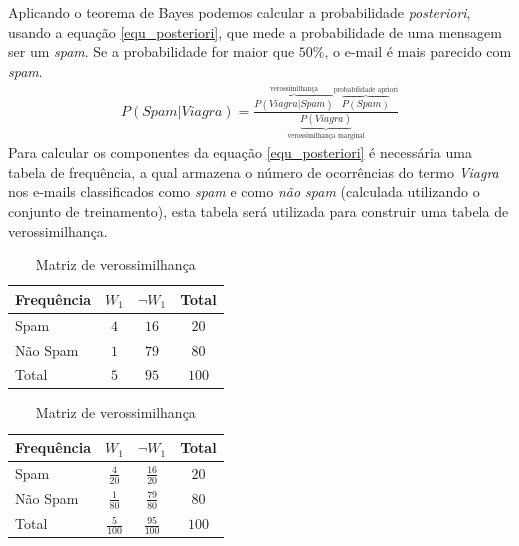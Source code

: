 Aplicando o teorema de Bayes podemos calcular a probabilidade \emph{posteriori}, usando a equação \eqref{equ_posteriori}, que mede a probabilidade de uma mensagem ser um \emph{spam}. Se a probabilidade for maior que \(50\%\), o e-mail é mais parecido com \emph{spam}.
\begin{align}
P(Spam|Viagra) =  \frac{\overbrace{P(Viagra|Spam)}^{\text{verossimilhança}} \overbrace{P(Spam)}^{\text{probabilidade apriori}}}{\underbrace{P(Viagra)}_{\text{verossimilhança marginal}}} \label{equ_posteriori}
\end{align}
Para calcular os componentes da equação \eqref{equ_posteriori} é necessária uma tabela de frequência, a qual armazena o número de ocorrências do termo \emph{Viagra} nos e-mails classificados como \emph{spam} e como \emph{não spam} (calculada utilizando o conjunto de treinamento), esta tabela será utilizada para construir uma tabela de verossimilhança.
\bgroup
\def\arraystretch{1.5}
\begin{table}[!htb]
	\caption{Matriz de frequência e de verossimilhança}
   \begin{subtable}{.5\linewidth}
    		\centering
    		
    			\begin{tabular}{lccc} \hline
    	
    			Frequência	& \(W_{1}\)		& \( \neg W_{1}\)			& Total   \\ \hline
    			Spam		& \(4\) 		& \(16\)			& \(20\)  \\ 
    			Não Spam	& \(1\) 		& \(79\)			& \(80\)  \\ 
    			Total		& \(5\) 		& \(95\)			& \(100\) \\ \hline
    			
    			\end{tabular}
    			\vspace{0.1cm}
    			\caption{Matriz de frequência}
    		\label{TABVEROSSIMILHANCA:ExemploDeTabela1}
   \end{subtable}%
   \begin{subtable}{.5\linewidth}
   		\centering
   	
   			\begin{tabular}{lccc} \hline
   	
   			Frequência	& \(W_{1}\)			& \( \neg W_{1}\)			& Total   \\ \hline
   			Spam		& \(\frac{4}{20}\) 	& \(\frac{16}{20}\)	& \(20\)  \\ 
   			Não Spam	& \(\frac{1}{80}\) 	& \(\frac{79}{80}\)	& \(80\)  \\ 
   			Total		& \(\frac{5}{100}\) & \(\frac{95}{100}\)& \(100\) \\ \hline
   			
   			\end{tabular}
   			\vspace{0.1cm}
   			\caption{Matriz de verossimilhança}
   		\label{TABVEROSSIMILHANCA:ExemploDeTabela2}
   \end{subtable}
\label{TABVEROSSIMILHANCA}
\vspace{0.1cm}
\end{table}

